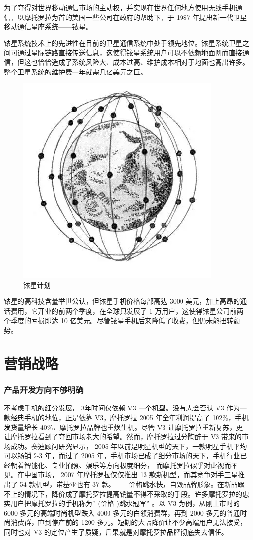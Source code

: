\documentclass{ctexart}
\begin{document}
为了夺得对世界移动通信市场的主动权，并实现在世界任何地方使用无线手机通信，以摩托罗拉为首的美国一些公司在政府的帮助下，于 1987 年提出新一代卫星移动通信星座系统——铱星。

铱星系统技术上的先进性在目前的卫星通信系统中处于领先地位。铱星系统卫星之间可通过星际链路直接传送信息，这使得铱星系统用户可以不依赖地面网而直接通信，但这也恰恰造成了系统风险大、成本过高、维护成本相对于地面也高出许多。整个卫星系统的维护费一年就需几亿美元之巨。

\begin{figure}[htpb]
	\centering
	\includegraphics[width=0.5\linewidth]{77.png}
	\caption{铱星计划}
	\label{fig:铱星计划}
\end{figure}

铱星的高科技含量举世公认，但铱星手机价格每部高达 3000 美元，加上高昂的通话费用，它开业的前两个季度，在全球只发展了 1 万用户，这使得铱星公司前两个季度的亏损即达 10 亿美元。尽管铱星手机后来降低了收费，但仍未能扭转颓势。

\section{营销战略}%
\label{sec:营销战略}

\subsubsection{产品开发方向不够明确}%
\label{ssub:产品开发方向不够明确}


不考虑手机的细分发展， 3年时间仅依赖 V3 一个机型。没有人会否认 V3 作为一款经典手机的地位，正是依靠 V3，摩托罗拉 2005 年全年利润提高了 102\%，手机发货量增长 40\%，摩托罗拉品牌也重焕生机。尽管 V3 让摩托罗拉重新复苏，更让摩托罗拉看到了夺回市场老大的希望。然而，摩托罗拉过分陶醉于 V3 带来的市场成功。赛迪顾问研究显示， 2005 年以前是明星机型的天下，一款明星手机平均可以畅销 2-3 年，而过了 2005 年，手机市场已成了细分市场的天下，手机行业已经朝着智能化、专业拍照、娱乐等方向极度细分， 而摩托罗拉似乎对此视而不见。在中国市场， 2007 年摩托罗拉仅仅推出 13 款新机型，而其竞争对手三星推出了 54 款机型，诺基亚也有 37 款。——价格跳水快，自毁品牌形象。在新品跟不上的情况下，降价成了摩托罗拉提高销量不得不采取的手段。许多摩托罗拉的忠实用户把摩托罗拉的手机称为“ (价格 )跳水冠军” 。以 V3 为例，从刚上市时的 6000 多元的高端时尚机型跌入 4000 多元的白领消费群，再到 2000 多元的普通时尚消费群，直到停产前的 1200 多元。短期的大幅降价让不少高端用户无法接受，同时也对 V3 的定位产生了质疑，后果就是对摩托罗拉品牌彻底失去信任。
\end{document}
